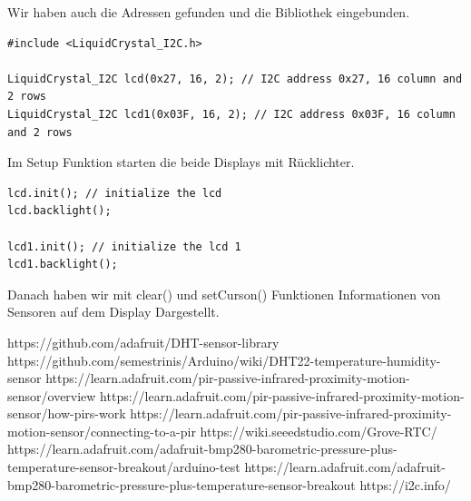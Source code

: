 \documentclass[conference]{IEEEtran}
\begin{document}
Wir haben auch die Adressen gefunden und die Bibliothek eingebunden.
\begin{lstlisting}[style=CStyle]
#include <LiquidCrystal_I2C.h>

LiquidCrystal_I2C lcd(0x27, 16, 2); // I2C address 0x27, 16 column and 2 rows
LiquidCrystal_I2C lcd1(0x03F, 16, 2); // I2C address 0x03F, 16 column and 2 rows
\end{lstlisting}\textbf{}

Im Setup Funktion starten die beide Displays mit Rücklichter.

\begin{lstlisting}[style=CStyle]
lcd.init(); // initialize the lcd
lcd.backlight();

lcd1.init(); // initialize the lcd 1
lcd1.backlight();
\end{lstlisting}\textbf{}

Danach haben wir mit clear() und setCurson() Funktionen Informationen von Sensoren auf dem Display Dargestellt.



\begin{thebibliography}{00}
 https://github.com/adafruit/DHT-sensor-library
 https://github.com/semestrinis/Arduino/wiki/DHT22-temperature-humidity-sensor
 https://learn.adafruit.com/pir-passive-infrared-proximity-motion-sensor/overview
 https://learn.adafruit.com/pir-passive-infrared-proximity-motion-sensor/how-pirs-work
 https://learn.adafruit.com/pir-passive-infrared-proximity-motion-sensor/connecting-to-a-pir
 https://wiki.seeedstudio.com/Grove-RTC/
 https://learn.adafruit.com/adafruit-bmp280-barometric-pressure-plus-temperature-sensor-breakout/arduino-test 
 https://learn.adafruit.com/adafruit-bmp280-barometric-pressure-plus-temperature-sensor-breakout
 https://i2c.info/
\end{thebibliography}
\vspace{12pt}
\end{document}
